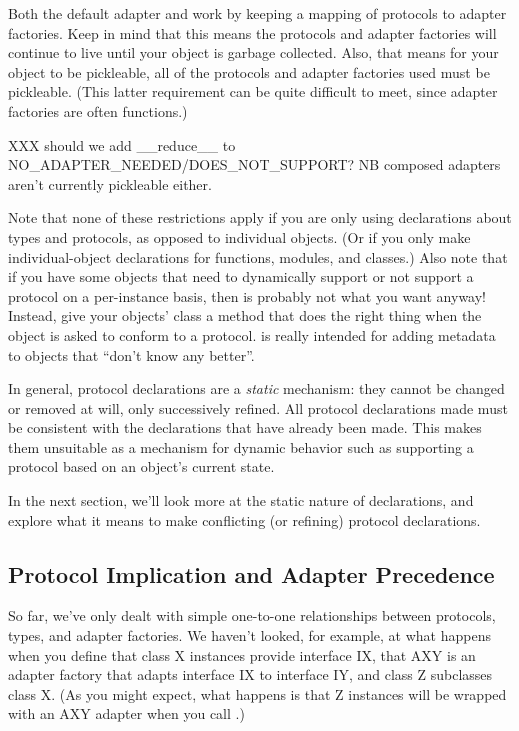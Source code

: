\begin{verbatim%
}
\begin{verbatim%
}
\begin{verbatim%
}
\begin{verbatim%
}
\begin{verbatim%
}
\begin{verbatim%
}
Both the default adapter and  work by keeping a mapping of
protocols to adapter factories.  Keep in mind that this means the protocols and
adapter factories will continue to live until your object is garbage collected.
Also, that means for your object to be pickleable, all of the protocols and
adapter factories used must be pickleable.  (This latter requirement can be
quite difficult to meet, since adapter factories are often functions.)

XXX should we add __reduce__ to NO_ADAPTER_NEEDED/DOES_NOT_SUPPORT?  NB
composed adapters aren't currently pickleable either.

Note that none of these restrictions apply if you are only using declarations
about types and protocols, as opposed to individual objects.  (Or if you only
make individual-object declarations for functions, modules, and classes.)
Also note that if you have some objects that need to dynamically support or
not support a protocol on a per-instance basis, then 
is probably not what you want anyway!  Instead, give your objects' class a
 method that does the right thing when the object is
asked to conform to a protocol.   is really intended
for adding metadata to objects that ``don't know any better''.

In general, protocol declarations are a \emph{static} mechanism: they cannot be
changed or removed at will, only successively refined.  All protocol
declarations made must be consistent with the declarations that have already
been made.  This makes them unsuitable as a mechanism for dynamic behavior such
as supporting a protocol based on an object's current state.

In the next section, we'll look more at the static nature of declarations,
and explore what it means to make conflicting (or refining) protocol
declarations.











\newpage
\subsection{Protocol Implication and Adapter Precedence \label{proto-implication}}

So far, we've only dealt with simple one-to-one relationships between
protocols, types, and adapter factories.  We haven't looked, for example, at
what happens when you define that class X instances provide interface IX,
that AXY is an adapter factory that adapts interface IX to interface IY, and
class Z subclasses class X.  (As you might expect, what happens is that Z
instances will be wrapped with an AXY adapter when you call
.)


\end{verbatim%
}
\end{verbatim%
}
\end{verbatim%
}
\end{verbatim%
}
\end{verbatim%
}
\end{verbatim%
}
